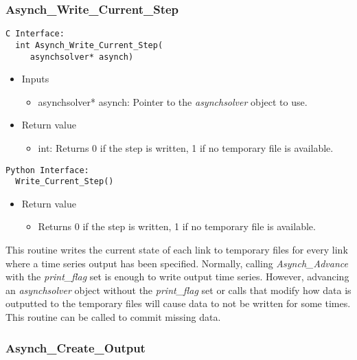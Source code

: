 \documentclass[12pt]{article}
\begin{document}
\subsubsection{Asynch\_Write\_Current\_Step} \label{sec: asynch_write_current_step}

\begin{lstlisting}[style=CStyle]
  C Interface:
  int Asynch_Write_Current_Step(
     asynchsolver* asynch)
\end{lstlisting}
\begin{itemize}
 \item Inputs
  \begin{itemize}
   \item asynchsolver* asynch: Pointer to the \emph{asynchsolver} object to use.
  \end{itemize}
 \item Return value
  \begin{itemize}
   \item int: Returns 0 if the step is written, 1 if no temporary file is available.
  \end{itemize}
\end{itemize}
\begin{lstlisting}[style=PythonStyle]
  Python Interface:
  Write_Current_Step()
\end{lstlisting}
\begin{itemize}
 \item Return value
  \begin{itemize}
   \item Returns 0 if the step is written, 1 if no temporary file is available.
  \end{itemize}
\end{itemize}
This routine writes the current state of each link to temporary files for every link where a time series output has been specified. Normally, calling \emph{Asynch\_Advance} with the \emph{print\_flag} set is enough to write output time series. However, advancing an \emph{asynchsolver} object without the \emph{print\_flag} set or calls that modify how data is outputted to the temporary files will cause data to not be written for some times. This routine can be called to commit missing data.


\subsubsection{Asynch\_Create\_Output} \label{sec: asynch_create_output}
\end{document}

